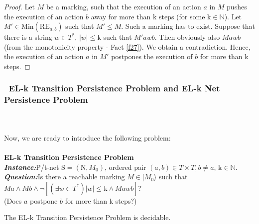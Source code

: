 \documentclass[a4paper]{llncs}
\begin{document}
\begin{proof}
Let $M$ be a marking, such that the execution of an action $a$ in $M$ pushes the execution of an action $b$ away for more than k steps (for some $\mathrm{k}\in\mathbb{N}$). Let $M'\in  \mathrm{Min}(\mathrm{RE}_{a,b})$ such that $M'\leq M$. Such a marking has to exist. Suppose that there is a string $w\in T^*$, $|w|\leq \mathrm{k}$ such that $M'awb$. Then obviously also $Mawb$ (from the monotonicity property - Fact \ref{f27}). We obtain a contradiction. Hence, the execution of an action $a$ in $M'$ postpones the execution of $b$ for more than k steps. 	
\end{proof}

\subsubsection{\textbullet \ EL-k Transition Persistence Problem and EL-k Net Persistence Problem}\mbox{ }\\
\\
Now, we are ready to introduce the following problem:
\\ \\
\textbf{EL-k Transition Persistence Problem}
\\
\indent\textbf{\emph{Instance:}}P/t-net $\mathrm{S}=(\mathrm{N}, M_0)$, ordered pair $(a,b)\in T\times T, b\neq a$, $\mathrm{k}\in\mathbb{N}$.\\
\indent\textbf{\emph{Question:}}Is there a reachable marking $M \in [M_0\rangle$ such that  \\
\indent\indent \indent\indent$Ma \land Mb \land \lnot[(\exists w\in T^*) |w|\leq \mathrm{k} \land Mawb]$?
\\
\indent\indent \indent\indent(Does $a$ postpone $b$ for more than k steps?)

\begin{theorem}
\label{t417}
The EL-k Transition Persistence Problem is decidable.
\end{theorem}
\end{document}
